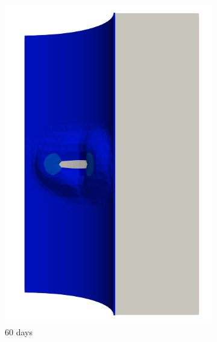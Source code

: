 \begin{figure}[!htb]
\begin{subfigure}[b]{0.2\textwidth}
    \includegraphics[width=\textwidth]{Chapter5/figures/spallation/seed_ep_2}
    \caption{60 days}
  \end{subfigure}
  \begin{subfigure}[b]{0.2\textwidth}
    \centering

\end{subfigure}
\end{figure}
